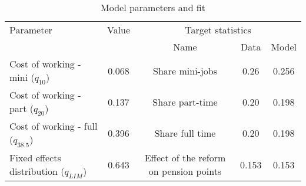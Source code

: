 \begin{table}[htbp]\caption{Model parameters and fit}\label{table:model_param}\centering\footnotesize\begin{tabular}{lcccc} \toprule  Parameter & Value & \multicolumn{3}{c}{Target statistics}  \\\cline{3-5}  &  &  Name & Data & Model  \\\midrule    Cost of working - mini ($q_{10}$)   &0.068& Share mini-jobs           & 0.26 &0.256\\ Cost of working - part ($q_{20}$)   &0.137& Share part-time           & 0.20 &0.198\\ Cost of working - full ($q_{38.5}$)      &0.396& Share full time      & 0.20 &0.198\\ Fixed effects distribution ($q_{LIM}$)    &0.643& Effect of the reform on pension points  & 0.153 & 0.153\\  \bottomrule\end{tabular}\end{table}